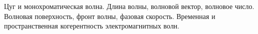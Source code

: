 \documentclass[__main__.tex]{subfiles}
\begin{document}
Цуг и монохроматическая волна. Длина волны, волновой вектор, волновое число. Волновая поверхность, фронт волны, фазовая скорость. Временная и пространственная когерентность электромагнитных волн.\\ 

\end{document}
